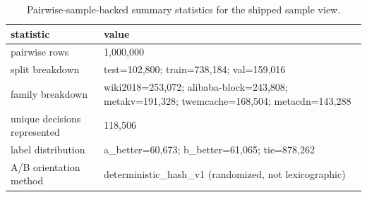 \begin{table}[t]
  \centering
  \footnotesize
  \caption{Pairwise-sample-backed summary statistics for the shipped sample view.}
  \label{tab:pairwise-sample-stats}
  \begin{tabularx}{\columnwidth}{@{}P{0.34\columnwidth}L@{}}
    \toprule
    statistic & value \\
    \midrule
    pairwise rows & 1,000,000 \\
    split breakdown & test=102,800; train=738,184; val=159,016 \\
    family breakdown & wiki2018=253,072; alibaba-block=243,808;\newline
    metakv=191,328; twemcache=168,504;\newline
    metacdn=143,288 \\
    unique decisions represented & 118,506 \\
    label distribution & a\_better=60,673; b\_better=61,065;\newline
    tie=878,262 \\
    A/B orientation method & deterministic\_hash\_v1 (randomized, not lexicographic) \\
    \bottomrule
  \end{tabularx}
\end{table}
